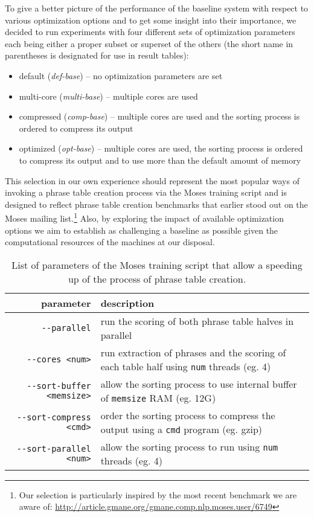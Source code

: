 To give a better picture of the performance of the baseline system with respect
to various optimization options and to get some insight into their importance,
we decided to run experiments with four different sets of optimization parameters
each being either a proper subset or superset of the others (the short name in
parentheses is designated for use in result tables):
\begin{itemize}
  \item default (\emph{def-base}) -- no optimization parameters are set
  \item multi-core (\emph{multi-base}) -- multiple cores are used
  \item compressed (\emph{comp-base}) -- multiple cores are used and
    the sorting process is ordered to compress its output
  \item optimized (\emph{opt-base}) -- multiple cores are used, the sorting process
    is ordered to compress its output and to use more than the default amount of memory
\end{itemize}

This selection in our own experience should represent the most popular ways of
invoking a phrase table creation process via the Moses training script and is designed to
reflect phrase table creation benchmarks that earlier stood out on the Moses mailing
list.\footnote{Our selection is particularly inspired by the most recent benchmark
we are aware of: \url{http://article.gmane.org/gmane.comp.nlp.moses.user/6749}}
Also, by exploring the impact of available optimization options we aim to establish
as challenging a baseline as possible given the computational resources of the machines
at our disposal.

\begin{table}[ht]
\centering
\begin{tabular}{ r p{86mm} }
parameter & description \\
\hline
\hline
\verb|--parallel|               & run the scoring of both phrase table halves in parallel \\
\verb|--cores <num>|            & run extraction of phrases and the scoring of each table half using \verb|num| threads (eg. 4) \\
\verb|--sort-buffer <memsize>|  & allow the sorting process to use internal buffer of \verb|memsize| RAM (eg. 12G)\\
\verb|--sort-compress <cmd>|    & order the sorting process to compress the output using a \verb|cmd| program (eg. gzip) \\
\verb|--sort-parallel <num>|    & allow the sorting process to run using \verb|num| threads (eg. 4)\\
\hline
\hline
\end{tabular}
\caption{\label{baseline-optimization-parameters}
List of parameters of the Moses training script that allow a speeding up of
the process of phrase table creation.}
\end{table}

